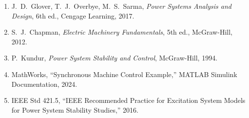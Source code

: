 \documentclass[12pt, a4paper]{article}
\begin{document}
\begin{enumerate}
    \item J.\ D.\ Glover, T.\ J.\ Overbye, M.\ S.\ Sarma, \textit{Power Systems Analysis and Design}, 6th ed., Cengage Learning, 2017.
    \item S.\ J.\ Chapman, \textit{Electric Machinery Fundamentals}, 5th ed., McGraw-Hill, 2012.
    \item P.\ Kundur, \textit{Power System Stability and Control}, McGraw-Hill, 1994.
    \item MathWorks, ``Synchronous Machine Control Example,'' MATLAB Simulink Documentation, 2024.
    \item IEEE Std 421.5, ``IEEE Recommended Practice for Excitation System Models for Power System Stability Studies,'' 2016.
\end{enumerate}
\end{document}
